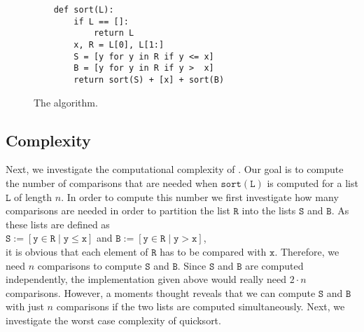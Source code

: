\begin{figure}[!ht]
  \centering
\begin{verbatim}
    def sort(L):
        if L == []:
            return L
        x, R = L[0], L[1:]
        S = [y for y in R if y <= x]
        B = [y for y in R if y >  x]
        return sort(S) + [x] + sort(B)
\end{verbatim}
\vspace*{-0.3cm}
  \caption{The  algorithm.}
  \label{fig:quick-sort.stlx}
\end{figure}

\subsection{Complexity}
Next, we investigate the computational complexity of .
Our goal is to compute the number of comparisons that are needed when
$\mathtt{sort}(\mathtt{L})$ is computed for a list $\mathtt{L}$ of length $n$.  In order to compute this number we
first investigate how many comparisons are needed in order to partition the list $\mathtt{R}$
into the lists $\mathtt{S}$ and $\mathtt{B}$.  As these lists are defined as 
\\[0.2cm]
\hspace*{1.3cm}
 $\mathtt{S} := [\mathtt{y} \in \mathtt{R} \mid \mathtt{y} \leq \mathtt{x}]$ \quad and \quad
 $\mathtt{B} := [\mathtt{y} \in \mathtt{R} \mid \mathtt{y} > \mathtt{x}]$,
\\[0.2cm]
it is obvious that each element of $\mathtt{R}$ has to be compared with $\mathtt{x}$.
Therefore, we need $n$ comparisons to compute $\mathtt{S}$ and $\mathtt{B}$.  Since $\mathtt{S}$ and
$\mathtt{B}$ are computed independently, the implementation given above 
would really need $2 \cdot n$ comparisons.  However, a moments thought reveals that we can compute $\mathtt{S}$ and $\mathtt{B}$
with just $n$ comparisons if the two lists are computed simultaneously.
Next, we investigate the worst case complexity of quicksort.

